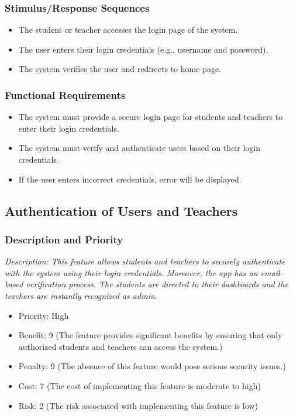\documentclass{article}
\begin{document}
\subsubsection{Stimulus/Response Sequences}
\begin{itemize}
  \item The student or teacher accesses the login page of the system.
  \item The user enters their login credentials (e.g., username and password).
  \item The system verifies the user and redirects to home page.
\end{itemize}

\subsubsection{Functional Requirements}
\begin{itemize}
\item The system must provide a secure login page for students and teachers to enter their login credentials.
\item The system must verify and authenticate users based on their login credentials.
\item If the user enters incorrect credentials, error will be displayed.
\end{itemize}




\subsection{Authentication of Users and Teachers}
\subsubsection{Description and Priority}
\emph{Description: This feature allows students and teachers to securely authenticate with the system using their login credentials. Moreover, the app has an email-based verification process. The students are directed to their dashboards and the teachers are instantly recognized as admin.}
\begin{itemize}
  \item Priority: High
  \item Benefit: 9 (The feature provides significant benefits by ensuring that only authorized students and teachers can access the system.)
  \item Penalty: 9 (The absence of this feature would pose serious security issues.)
  \item Cost: 7 (The cost of implementing this feature is moderate to high)
  \item Risk: 2 (The risk associated with implementing this feature is low)
\end{itemize}
\end{document}
